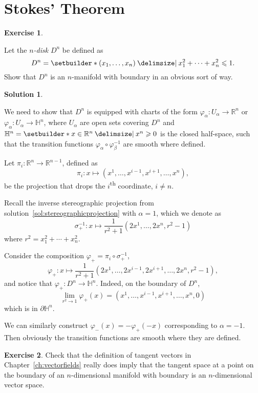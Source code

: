 \documentclass[11pt, a4paper]{report}
\theoremstyle{definition}
\newtheorem{ex}{Exercise}[part]
\newtheorem{sol}{Solution}[part]
\renewcommand{\leq}{\leqslant}
\renewcommand{\geq}{\geqslant}
\begin{document}
\section{Stokes' Theorem}

\begin{ex}\label{ex:ndisk}

Let the \emph{$n$-disk} $D^n$ be defined as
\[
    D^n = \setbuilder*{(x_1, \ldots, x_n) \given x_1^2 + \cdots + x_n^2 \leq 1}.
\]
Show that $D^n$ is an $n$-manifold with boundary in an obvious sort of way.

\end{ex}

\begin{sol}\label{sol:ndisk}

We need to show that $D^n$ is equipped with charts of the form $\varphi_\alpha: U_\alpha \to \mathbb{R}^n$ or $\varphi_\alpha: U_\alpha \to \mathbb{H}^n$, where $U_\alpha$ are open sets covering $D^n$ and $\mathbb{H}^n = \setbuilder*{x \in \mathbb{R}^n \given x^n \geq 0}$ is the closed half-space, such that the transition functions $\varphi_\alpha \circ \varphi_\beta^{-1}$ are smooth where defined.

Let $\pi_i: \mathbb{R}^{n} \to \mathbb{R}^{n - 1}$, defined as
\[
    \pi_i: x \mapsto (x^1, \ldots, x^{i - 1}, x^{i + 1}, \ldots, x^{n}),
\]
be the projection that drops the $i$\textsuperscript{th} coordinate, $i \neq n$.

Recall the inverse stereographic projection from solution~\ref{sol:stereographicprojection} with $\alpha = 1$, which we denote as
\[
    \sigma_+^{-1}: x \mapsto \frac{1}{r^2 + 1} (2x^1, \ldots, 2x^n, r^2 - 1)
\]
where $r^2 = x_1^2 + \cdots + x_n^2$.

Consider the composition $\varphi_+ = \pi_i \circ \sigma_+^{-1}$,
\[
    \varphi_+: x \mapsto \frac{1}{r^2 + 1} (2x^1, \ldots, 2x^{i - 1}, 2x^{i + 1}, \ldots, 2x^n, r^2 - 1),
\]
and notice that $\varphi_+: D^n \to \mathbb{H}^n$. Indeed, on the boundary of $D^n$,
\[
    \lim_{r^2 \to 1} \varphi_+(x) = (x^1, \ldots, x^{i - 1}, x^{i + 1}, \ldots, x^n, 0)
\]
which is in $\partial \mathbb{H}^n$.

We can similarly construct $\varphi_-(x) = -\varphi_+(-x)$ corresponding to $\alpha = -1$. Then obviously the transition functions are smooth where they are defined.

\end{sol}

\begin{ex}

Check that the definition of tangent vectors in Chapter~\ref{ch:vectorfields} really does imply that the tangent space at a point on the boundary of an $n$-dimensional manifold with boundary is an $n$-dimensional vector space.

\end{ex}
\end{document}
